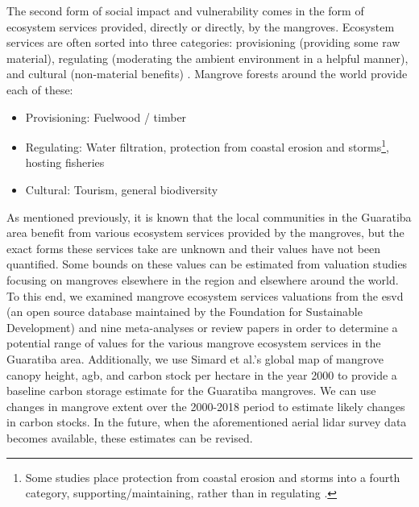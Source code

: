 The second form of social impact and vulnerability comes in the form of ecosystem services provided, directly or directly, by the mangroves. Ecosystem services are often sorted into three categories: provisioning (providing some raw material), regulating (moderating the ambient environment in a helpful manner), and cultural (non-material benefits) \cite{haines-youngCommonInternationalClassification2018}. Mangrove forests around the world provide each of these:

\begin{itemize}[itemsep=0pt,parsep=0pt]
	\item{Provisioning: Fuelwood / timber}
	\item{Regulating: Water filtration, protection from coastal erosion and storms\footnote{Some studies place protection from coastal erosion and storms into a fourth category, supporting/maintaining, rather than in regulating \cite{getznerEcosystemServicesMangrove2020}.}, hosting fisheries}
	\item{Cultural: Tourism, general biodiversity}
\end{itemize}

As mentioned previously, it is known that the local communities in the Guaratiba area benefit from various ecosystem services provided by the mangroves, but the exact forms these services take are unknown and their values have not been quantified. Some bounds on these values can be estimated from valuation studies focusing on mangroves elsewhere in the region and elsewhere around the world. To this end, we examined mangrove ecosystem services valuations from the \ac{esvd} \cite{grootEcosystemServicesValuation2020} (an open source database maintained by the Foundation for Sustainable Development) and nine meta-analyses or review papers \cite{branderEmpiricsWetlandValuation2006,branderEcosystemServiceValues2012, salemEconomicValueMangroves2012, veghMangroveEcosystemServices2014, voReviewValuationMethods2012, himes-cornellMangroveEcosystemService2018, getznerEcosystemServicesMangrove2020, barbierProtectiveServiceMangrove2016, barbierEstuarineCoastalEcosystems2020} in order to determine a potential range of values for the various mangrove ecosystem services in the Guaratiba area. Additionally, we use Simard et al.'s global map of mangrove canopy height, \ac{agb}, and carbon stock per hectare in the year 2000 \cite{simardMangroveCanopyHeight2019} to provide a baseline carbon storage estimate for the Guaratiba mangroves. We can use changes in mangrove extent over the 2000-2018 period to estimate likely changes in carbon stocks. In the future, when the aforementioned aerial \ac{lidar} survey data becomes available, these estimates can be revised.


